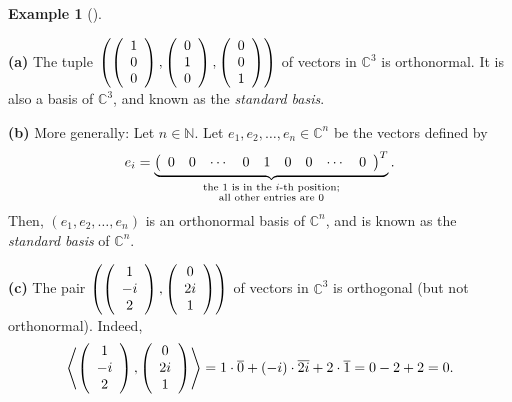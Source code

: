 \documentclass[numbers=enddot,12pt,final,onecolumn,notitlepage]{scrartcl}%
\numberwithin{exer}{subsection}
\theoremstyle{definition}
\newtheorem{exam}[theo]{Example}
\newenvironment{example}[1][]
{\begin{exam}[#1]\begin{leftbar}}
{\end{leftbar}\end{exam}}
\begin{document}
\begin{example}
\textbf{(a)} The tuple $\left(  \left(
\begin{array}
[c]{c}%
1\\
0\\
0
\end{array}
\right)  ,\left(
\begin{array}
[c]{c}%
0\\
1\\
0
\end{array}
\right)  ,\left(
\begin{array}
[c]{c}%
0\\
0\\
1
\end{array}
\right)  \right)  $ of vectors in $\mathbb{C}^{3}$ is orthonormal. It is also
a basis of $\mathbb{C}^{3}$, and known as the \emph{standard basis}.

\textbf{(b)} More generally: Let $n\in\mathbb{N}$. Let $e_{1},e_{2}%
,\ldots,e_{n}\in\mathbb{C}^{n}$ be the vectors defined by%
\[
e_{i}=\underbrace{\left(
\begin{array}
[c]{ccccccccc}%
0 & 0 & \cdots & 0 & 1 & 0 & 0 & \cdots & 0
\end{array}
\right)  ^{T}}_{\substack{\text{the }1\text{ is in the }i\text{-th
position;}\\\text{all other entries are }0}}.
\]
Then, $\left(  e_{1},e_{2},\ldots,e_{n}\right)  $ is an orthonormal basis of
$\mathbb{C}^{n}$, and is known as the \emph{standard basis} of $\mathbb{C}%
^{n}$.

\textbf{(c)} The pair $\left(  \left(
\begin{array}
[c]{c}%
1\\
-i\\
2
\end{array}
\right)  ,\left(
\begin{array}
[c]{c}%
0\\
2i\\
1
\end{array}
\right)  \right)  $ of vectors in $\mathbb{C}^{3}$ is orthogonal (but not
orthonormal). Indeed,%
\[
\left\langle \left(
\begin{array}
[c]{c}%
1\\
-i\\
2
\end{array}
\right)  ,\left(
\begin{array}
[c]{c}%
0\\
2i\\
1
\end{array}
\right)  \right\rangle =1\cdot\overline{0}+\left(  -i\right)  \cdot
\overline{2i}+2\cdot\overline{1}=0-2+2=0.
\]



\end{example}
\end{document}
